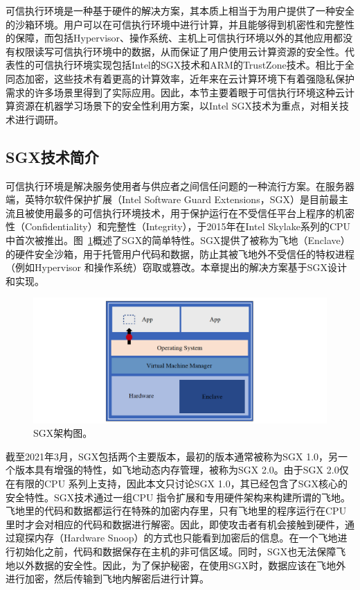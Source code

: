 可信执行环境是一种基于硬件的解决方案，其本质上相当于为用户提供了一种安全的沙箱环境。用户可以在可信执行环境中进行计算，并且能够得到机密性和完整性的保障，而包括Hypervisor、操作系统、主机上可信执行环境以外的其他应用都没有权限读写可信执行环境中的数据，从而保证了用户使用云计算资源的安全性。代表性的可信执行环境实现包括Intel的SGX技术和ARM的TrustZone\parencite{azab2014hypervision}技术。相比于全同态加密，这些技术有着更高的计算效率，近年来在云计算环境下有着强隐私保护需求的许多场景里得到了实际应用。因此，本节主要着眼于可信执行环境这种云计算资源在机器学习场景下的安全性利用方案，以Intel SGX技术为重点，对相关技术进行调研。

\subsection{SGX技术简介}
可信执行环境是解决服务使用者与供应者之间信任问题的一种流行方案。在服务器端，英特尔软件保护扩展（Intel Software Guard Extensions，SGX）是目前最主流且被使用最多的可信执行环境技术，用于保护运行在不受信任平台上程序的机密性（Confidentiality）和完整性（Integrity），于2015年在Intel Skylake系列的CPU\parencite{costan2016intel}中首次被推出。图~\ref{sgx_arch}概述了SGX的简单特性。SGX提供了被称为飞地（Enclave）的硬件安全沙箱，用于托管用户代码和数据，防止其被飞地外不受信任的特权进程（例如Hypervisor 和操作系统）窃取或篡改。本章提出的解决方案基于SGX设计和实现。

\begin{figure}[h]
    \centerline{\includegraphics[width=\textwidth]{figures/sgx-arch.png}}
    \caption{SGX架构图。}
    \label{sgx_arch}
\end{figure}

截至2021年3月，SGX包括两个主要版本，最初的版本通常被称为SGX 1.0，另一个版本具有增强的特性，如飞地动态内存管理，被称为SGX 2.0。由于SGX 2.0仅在有限的CPU 系列上支持，因此本文只讨论SGX 1.0，其已经包含了SGX核心的安全特性。SGX技术通过一组CPU 指令扩展和专用硬件架构来构建所谓的飞地。飞地里的代码和数据都运行在特殊的加密内存里，只有飞地里的程序运行在CPU 里时才会对相应的代码和数据进行解密。因此，即使攻击者有机会接触到硬件，通过窥探内存（Hardware Snoop）的方式也只能看到加密后的信息。在一个飞地进行初始化之前，代码和数据保存在主机的非可信区域。同时，SGX也无法保障飞地以外数据的安全性。因此，为了保护秘密，在使用SGX时，数据应该在飞地外进行加密，然后传输到飞地内解密后进行计算。

